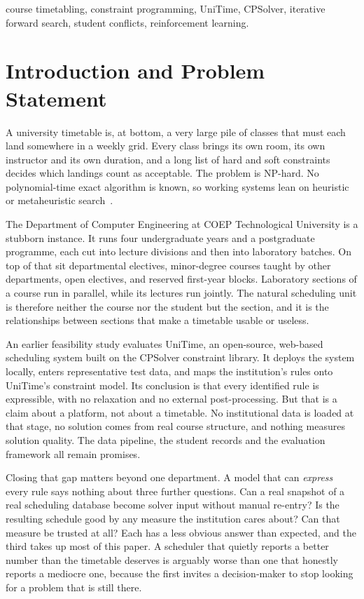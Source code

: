 \documentclass[journal]{IEEEtran}
\begin{document}
\begin{IEEEkeywords}
course timetabling, constraint programming, UniTime, CPSolver, iterative forward search, student conflicts, reinforcement learning.
\end{IEEEkeywords}

\section{Introduction and Problem Statement}
\label{sec:intro}

A university timetable is, at bottom, a very large pile of classes that must each land somewhere in a weekly grid. Every class brings its own room, its own instructor and its own duration, and a long list of hard and soft constraints decides which landings count as acceptable. The problem is NP-hard. No polynomial-time exact algorithm is known, so working systems lean on heuristic or metaheuristic search~\cite{schaerf1999survey}.

The Department of Computer Engineering at COEP Technological University is a stubborn instance. It runs four undergraduate years and a postgraduate programme, each cut into lecture divisions and then into laboratory batches. On top of that sit departmental electives, minor-degree courses taught by other departments, open electives, and reserved first-year blocks. Laboratory sections of a course run in parallel, while its lectures run jointly. The natural scheduling unit is therefore neither the course nor the student but the section, and it is the relationships between sections that make a timetable usable or useless.

An earlier feasibility study evaluates UniTime, an open-source, web-based scheduling system built on the CPSolver constraint library. It deploys the system locally, enters representative test data, and maps the institution's rules onto UniTime's constraint model. Its conclusion is that every identified rule is expressible, with no relaxation and no external post-processing. But that is a claim about a platform, not about a timetable. No institutional data is loaded at that stage, no solution comes from real course structure, and nothing measures solution quality. The data pipeline, the student records and the evaluation framework all remain promises.

Closing that gap matters beyond one department. A model that can \emph{express} every rule says nothing about three further questions. Can a real snapshot of a real scheduling database become solver input without manual re-entry? Is the resulting schedule good by any measure the institution cares about? Can that measure be trusted at all? Each has a less obvious answer than expected, and the third takes up most of this paper. A scheduler that quietly reports a better number than the timetable deserves is arguably worse than one that honestly reports a mediocre one, because the first invites a decision-maker to stop looking for a problem that is still there.
\end{document}

